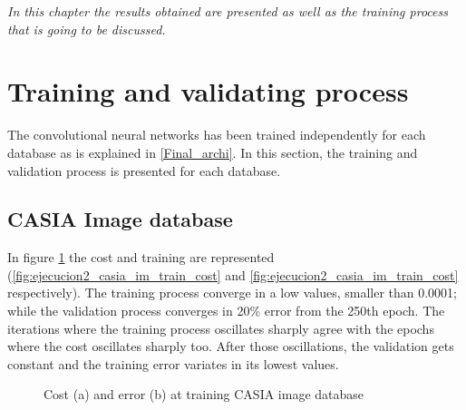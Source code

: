 \minitoc
\mtcskip

\begin{small}
\emph{In this chapter the results obtained are presented as well as the training process that is going to be discussed.\\}
\end{small} 

\section{Training and validating process}
The convolutional neural networks has been trained independently for each database as is explained in \ref{Final_archi}. In this section, the training and validation process is presented for each database.\\
\subsection{CASIA Image database}
In figure \ref{fig:ejecucion2_casia_im_train} the cost and training are represented (\ref{fig:ejecucion2_casia_im_train_cost} and \ref{fig:ejecucion2_casia_im_train_cost} respectively). The training process converge in a low values, smaller than 0.0001; while the validation process converges in 20\% error from the 250th epoch. The iterations where the training process oscillates sharply agree with the epochs where the cost oscillates sharply too. After those oscillations, the validation gets constant and the training error variates in its lowest values.\\
\begin{figure}[htb]
\centering
\caption{Cost (a) and error (b) at training CASIA image database}
\label{fig:ejecucion2_casia_im_train}
\end{figure}

